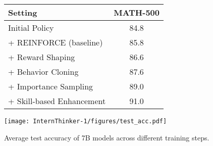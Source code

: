 \begin{figure}[t]
    \centering
    \begin{minipage}{0.45\linewidth}
        \centering
        \small
        \begin{tabular}{lc}
            \toprule
            \textbf{Setting} & \textbf{MATH-500}  \\ \midrule
            Initial Policy & 84.8  \\
            + REINFORCE (baseline) & 85.8  \\
            + Reward Shaping & 86.6  \\
            + Behavior Cloning & 87.6 \\
            + Importance Sampling & 89.0  \\ 
            + Skill-based Enhancement & 91.0 \\ \bottomrule
        \end{tabular}
        \vspace{1em}
        \label{tab: ablation}
    \end{minipage}
    \hfill
    \begin{minipage}{0.45\linewidth}
        \centering
        \texttt{[image: InternThinker-1/figures/test\_acc.pdf]}
        \vspace{-2em}
        \caption{Average test accuracy of 7B models across different training steps.}
        \label{fig: test acc}
    \end{minipage}
\end{figure}